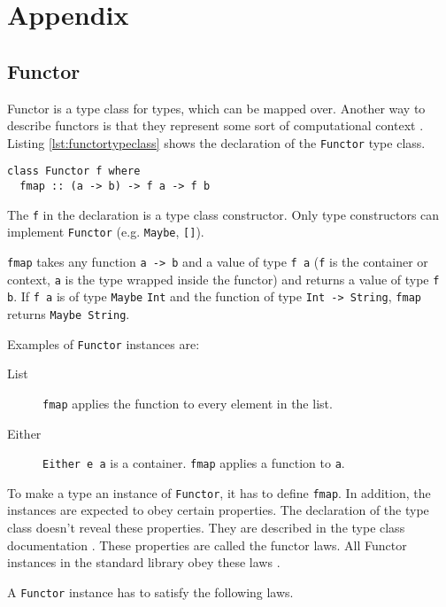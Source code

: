 \section{Appendix}
\label{sec:appendix}

\subsection{Functor}
\label{sec:functor}

Functor is a type class for types, which can be mapped over. Another way to describe functors is that they represent some sort of computational context \cite{yorgey}. Listing \ref{lst:functortypeclass} shows the declaration of the \verb|Functor| type class.
\begin{lstlisting}[caption={Declaration of {\ttfamily Functor} type class},label={lst:functortypeclass}]
class Functor f where
  fmap :: (a -> b) -> f a -> f b
\end{lstlisting}

The \verb|f| in the declaration is a type class constructor. Only type constructors can implement \verb|Functor| (e.g. \verb|Maybe|, \verb|[]|).

\verb|fmap| takes any function \verb|a -> b| and a value of type \verb|f a| (\verb|f| is the container or context, \verb|a| is the type wrapped inside the functor) and returns a value of type \verb|f b|. 
If \verb|f a| is of type \verb|Maybe| \verb|Int| and the function of type \verb|Int -> String|, \verb|fmap| returns \verb|Maybe String|. 

Examples of \verb|Functor| instances are:

\begin{description}
\item[List] \verb|fmap| applies the function to every element in the list.
\item[Either] \verb|Either e a| is a container. \verb|fmap| applies a function to \verb|a|.
\end{description}

To make a type an instance of \verb|Functor|, it has to define \verb|fmap|. In addition, the instances are expected to obey certain properties. The declaration of the type class doesn't reveal these properties. They are described in the type class documentation \cite{data.functor} \cite{Marlow_2010}. These properties are called the functor laws. All Functor instances in the standard library obey these laws \cite{yorgey} \cite{Lipovaca}.

A \verb|Functor| instance has to satisfy the following laws.

